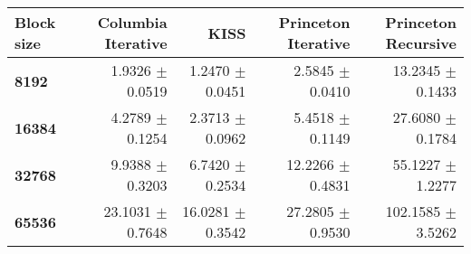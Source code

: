 \begin{tabular}{lrrrr}\toprule
\textbf{Block size}  & \textbf{Columbia Iterative} & \textbf{KISS} & \textbf{Princeton Iterative} & \textbf{Princeton Recursive}\\\midrule
\textbf{8192}  & 1.9326 $\pm$ 0.0519 & 1.2470 $\pm$ 0.0451 & 2.5845 $\pm$ 0.0410 & 13.2345 $\pm$ 0.1433\\
\textbf{16384}  & 4.2789 $\pm$ 0.1254 & 2.3713 $\pm$ 0.0962 & 5.4518 $\pm$ 0.1149 & 27.6080 $\pm$ 0.1784\\
\textbf{32768}  & 9.9388 $\pm$ 0.3203 & 6.7420 $\pm$ 0.2534 & 12.2266 $\pm$ 0.4831 & 55.1227 $\pm$ 1.2277\\
\textbf{65536} & 23.1031 $\pm$ 0.7648 & 16.0281 $\pm$ 0.3542 & 27.2805 $\pm$ 0.9530 & 102.1585 $\pm$ 3.5262\\
\bottomrule
\end{tabular}

